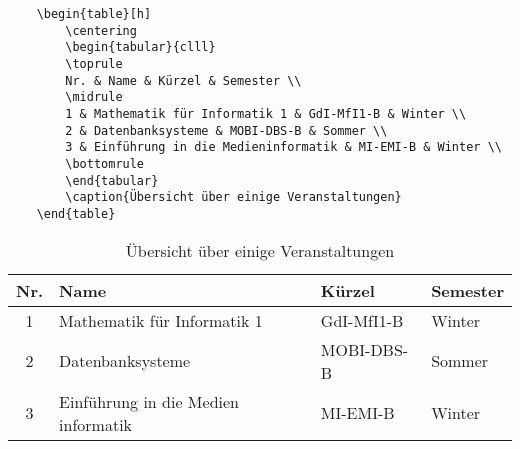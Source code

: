 \begin{verbatim}
	\begin{table}[h]
		\centering
		\begin{tabular}{clll}
		\toprule
		Nr. & Name & Kürzel & Semester \\
		\midrule
		1 & Mathematik für Informatik 1 & GdI-MfI1-B & Winter \\
		2 & Datenbanksysteme & MOBI-DBS-B & Sommer \\
		3 & Einführung in die Medieninformatik & MI-EMI-B & Winter \\		
		\bottomrule
		\end{tabular}
		\caption{Übersicht über einige Veranstaltungen}
	\end{table}
\end{verbatim}

\begin{table}[h]
	\centering
	\begin{tabular}{clll}
		\toprule
		Nr.	&	Name						&	Kürzel		&	Semester	\\
		\midrule
		1	&	Mathematik für Informatik 1	&	GdI-MfI1-B	&	Winter		\\
		2	&	Datenbanksysteme			&	MOBI-DBS-B	&	Sommer		\\
		3	&	Einführung in die Medien
		informatik							&	MI-EMI-B	&	Winter		\\		
		\bottomrule
	\end{tabular}
	\caption{Übersicht über einige Veranstaltungen}
\end{table}